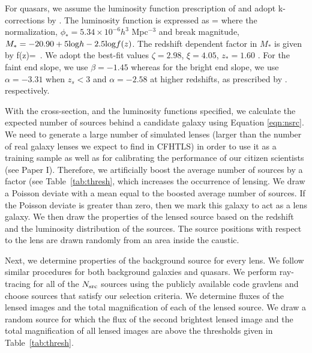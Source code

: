\documentclass[useAMS,usenatbib,a4paper]{mn2e}
\begin{document}
For quasars, we assume the luminosity function prescription of \citep{Ogur2010}
and adopt k-corrections by \citep{Richards2006}.
The luminosity function is expressed as
\be
{}=
\ee
where the normalization, $\phi_{*}=5.34\times10^{-6} h^3$ Mpc$^{-3}$ and break
magnitude, $M_*=-20.90 + 5 {\rm log} h - 2.5 {\rm log} f(z)$. The redshift
dependent factor in $M_*$ is given by
\be
f(z)= \,.
\ee
We adopt the best-fit values $\zeta=2.98$, $\xi=4.05$, $z_{*}=1.60$
\citep{Oguri2010}. For the faint end slope, we use $\beta=-1.45$ whereas for
the bright end slope, we use $\alpha=-3.31$ when $z_s<3$ and $\alpha=-2.58$ at
higher redshifts, as prescribed by \citep{Oguri2010}.
respectively.


With the cross-section, and the luminosity functions specified, we calculate the
expected number of sources behind a candidate galaxy using Equation
\ref{eqn:nsrc}. We need to generate a large number of simulated lenses (larger
than the number of real galaxy lenses we expect to find in CFHTLS) in order to
use it as a training sample as well as for calibrating the performance of our
citizen scientists (see Paper I). Therefore, we artificially boost the average
number of sources by a factor (see Table~\ref{tab:thresh}, which increases the
occurrence of lensing. We draw a Poisson deviate with a mean equal to the
boosted average number of sources. If the Poisson deviate is greater than zero,
then we mark this galaxy to act as a lens galaxy. We then draw the properties of
the lensed source based on the redshift and the luminosity distribution of the
sources. The source positions with respect to the lens are drawn randomly from
an area inside the caustic.

Next, we determine properties of the background source for every lens. We follow
similar procedures for both background galaxies and quasars. We perform
ray-tracing for all of the $N_{\rm src}$ sources using the publicly available
code {\sc gravlens} \citep{Keeton2000} and choose sources that satisfy our
selection criteria. We determine fluxes of the lensed images and the total
magnification of each of the lensed source. We draw a random source for which
the flux of the second brightest lensed image and the total magnification of all
lensed images are above the thresholds given in Table~\ref{tab:thresh}.
\end{document}
